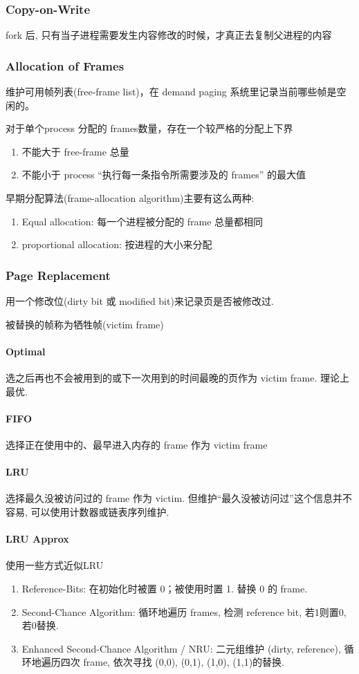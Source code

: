 \subsubsection{Copy-on-Write}
fork 后, 只有当子进程需要发生内容修改的时候，才真正去复制父进程的内容

\subsubsection{Allocation of Frames}
维护可用帧列表(free-frame list)，在 demand paging 系统里记录当前哪些帧是空闲的。

对于单个process 分配的 frames数量，存在一个较严格的分配上下界
\begin{enumerate}
    \item 不能大于 free-frame 总量
    \item 不能小于 process ``执行每一条指令所需要涉及的 frames'' 的最大值
\end{enumerate}

早期分配算法(frame-allocation algorithm)主要有这么两种:
\begin{enumerate}
    \item Equal allocation: 每一个进程被分配的 frame 总量都相同
    \item proportional allocation: 按进程的大小来分配
\end{enumerate}

\subsubsection{Page Replacement}
用一个修改位(dirty bit 或 modified bit)来记录页是否被修改过. 

被替换的帧称为牺牲帧(victim frame)

\paragraph{Optimal}选之后再也不会被用到的或下一次用到的时间最晚的页作为 victim frame. 理论上最优. 
\paragraph{FIFO}选择正在使用中的、最早进入内存的 frame 作为 victim frame
\paragraph{LRU}选择最久没被访问过的 frame 作为 victim. 但维护``最久没被访问过''这个信息并不容易, 可以使用计数器或链表序列维护. 
\paragraph{LRU Approx}使用一些方式近似LRU
\begin{enumerate}
    \item Reference-Bits: 在初始化时被置 0；被使用时置 1. 替换 0 的 frame. 
    \item Second-Chance Algorithm: 循环地遍历 frames, 检测 reference bit, 若1则置0, 若0替换. 
    \item Enhanced Second-Chance Algorithm / NRU: 二元组维护 (dirty, reference), 循环地遍历四次 frame, 依次寻找 (0,0), (0,1), (1,0), (1,1)的替换. 
\end{enumerate}

